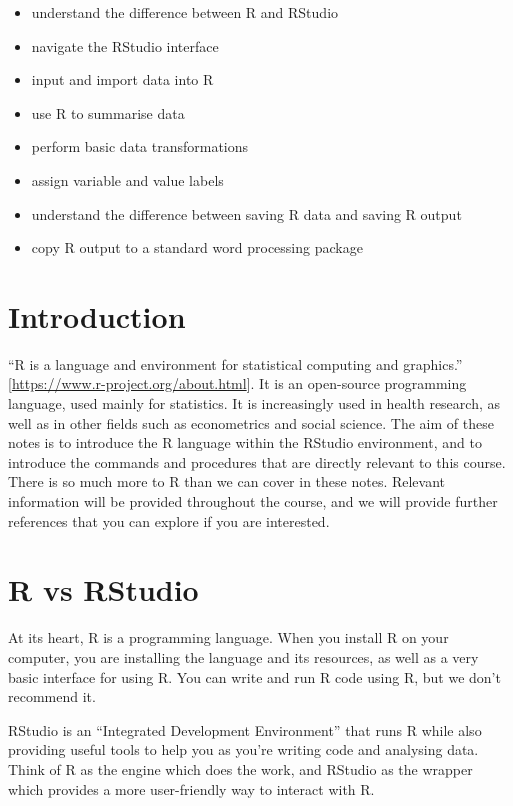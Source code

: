 \documentclass[
]{memoir}
\providecommand{\tightlist}{%
  \setlength{\itemsep}{0pt}\setlength{\parskip}{0pt}}
\begin{document}
\begin{itemize}
\tightlist
\item
  understand the difference between R and RStudio
\item
  navigate the RStudio interface
\item
  input and import data into R
\item
  use R to summarise data
\item
  perform basic data transformations
\item
  assign variable and value labels
\item
  understand the difference between saving R data and saving R output
\item
  copy R output to a standard word processing package
\end{itemize}

\hypertarget{introduction-1}{%
\section{Introduction}\label{introduction-1}}

``R is a language and environment for statistical computing and graphics.'' {[}\url{https://www.r-project.org/about.html}{]}. It is an open-source programming language, used mainly for statistics. It is increasingly used in health research, as well as in other fields such as econometrics and social science. The aim of these notes is to introduce the R language within the RStudio environment, and to introduce the commands and procedures that are directly relevant to this course. There is so much more to R than we can cover in these notes. Relevant information will be provided throughout the course, and we will provide further references that you can explore if you are interested.

\hypertarget{r-vs-rstudio}{%
\section{R vs RStudio}\label{r-vs-rstudio}}

At its heart, R is a programming language. When you install R on your computer, you are installing the language and its resources, as well as a very basic interface for using R. You can write and run R code using R, but we don't recommend it.

RStudio is an ``Integrated Development Environment'' that runs R while also providing useful tools to help you as you're writing code and analysing data. Think of R as the engine which does the work, and RStudio as the wrapper which provides a more user-friendly way to interact with R.
\end{document}
